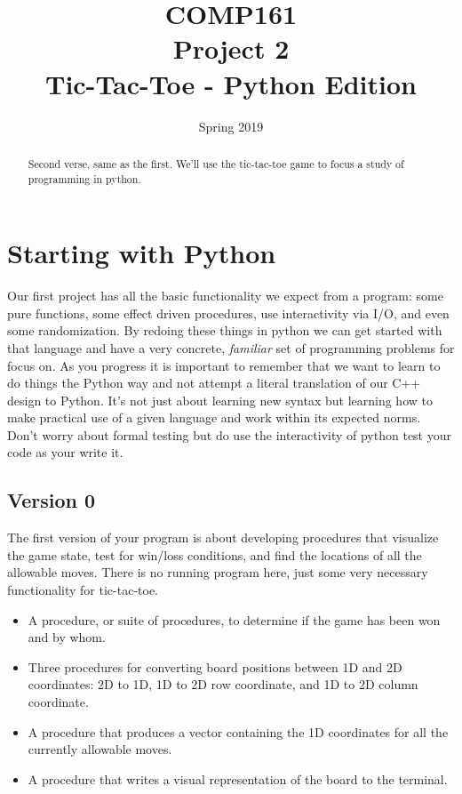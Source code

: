 \documentclass[]{tufte-handout}
\title{COMP161 \\ Project 2 \\ Tic-Tac-Toe - Python Edition}
\author{}
\date{Spring 2019}
\begin{document}
\maketitle

\begin{abstract}
Second verse, same as the first. We'll use the tic-tac-toe game to focus a study of programming in python.
\end{abstract}

\section{Starting with Python}

Our first project has all the basic functionality we expect from a program: some pure functions, some effect driven procedures, use interactivity via I/O, and even some randomization. By redoing these things in python we can get started with that language and have a very concrete, \textit{familiar} set of programming problems for focus on. As you progress it is important to remember that we want to learn to do things the Python way and not attempt a literal translation of our C++ design to Python. It's not just about learning new syntax but learning how to make practical use of a given language and work within its expected norms. Don't worry about formal testing but do use the interactivity of python test your code as your write it.

\subsection{Version 0}

The first version of your program is about developing procedures that visualize
the game state, test for win/loss conditions, and find the locations of all the
allowable moves. There is no running program here, just some very necessary
functionality for tic-tac-toe.

\begin{itemize}
  \item A procedure, or suite of procedures, to determine if the game has been
   won and by whom.
  \item Three procedures for converting board positions between 1D and 2D
    coordinates: 2D to 1D, 1D to 2D row coordinate, and 1D to 2D column coordinate.
  \item A procedure that produces a vector containing the 1D coordinates for
  all the currently allowable moves.
  \item A procedure that writes a visual representation of the board to the
  terminal.
\end{itemize}
\end{document}
